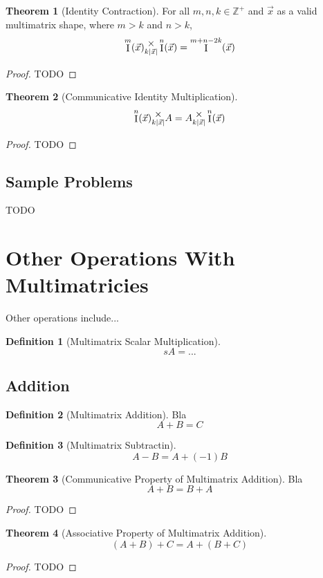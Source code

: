 \documentclass[12pt]{article}
\theoremstyle{definition}
\newtheorem{definition}{Definition}[section]
\newtheorem{theorem}{Theorem}[section]
\theoremstyle{case}
\theoremstyle{ppart}
\DeclareMathOperator{\Ident}{I}
\newcommand{\mmult}[1]{\text{\raisebox{1ex}{$\underset{#1}{\times}$}}}
\begin{document}
\begin{theorem}[Identity Contraction]
For all $m, n, k \in \mathbb{Z}^+$ and $\vec{x}$ as a valid multimatrix shape,
where $m > k$ and $n > k$,
\[ \Ident^m(\vec{x}) \mmult{k|\vec{x}|} \Ident^n(\vec{x}) = \Ident^{m+n-2k}(\vec{x}) \]
\end{theorem}
\begin{proof}
TODO
\end{proof}

\begin{theorem}[Communicative Identity Multiplication]
\[ \Ident^n(\vec{x}) \mmult{k|\vec{x}|} A = A \mmult{k|\vec{x}|} \Ident^n(\vec{x}) \]
\end{theorem}
\begin{proof}
TODO
\end{proof}

\subsection*{Sample Problems}
TODO

\section{Other Operations With Multimatricies}
Other operations include...

\begin{definition}[Multimatrix Scalar Multiplication]
\[ sA = ...\]
\end{definition}

\subsection{Addition}

\begin{definition}[Multimatrix Addition]
Bla
\[ A + B = C \]
\end{definition}

\begin{definition}[Multimatrix Subtractin]
\[ A - B = A + (-1)B \]
\end{definition}

\begin{theorem}[Communicative Property of Multimatrix Addition]
Bla
\[ A + B = B + A \]
\end{theorem}
\begin{proof}
TODO
\end{proof}

\begin{theorem}[Associative Property of Multimatrix Addition]
\[ (A + B) + C = A + (B + C) \]
\end{theorem}
\begin{proof}
TODO
\end{proof}
\end{document}
